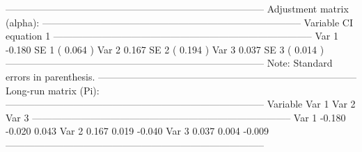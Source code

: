 \documentclass[article]{jss}
\begin{document}
\begin{CodeChunk}
\begin{CodeOutput}
--------------------------------------------------------------------------------
    Adjustment matrix (alpha):                                                                         
--------------------------------------------------------------------------------
      Variable        CI equation 1  
--------------------------------------------------------------------------------
        Var 1            -0.180     
         SE 1         (   0.064  )  
        Var 2             0.167     
         SE 2         (   0.194  )  
        Var 3             0.037     
         SE 3         (   0.014  )  
--------------------------------------------------------------------------------
Note: Standard errors in parenthesis.                                                                
--------------------------------------------------------------------------------
    Long-run matrix (Pi):                                                                       
--------------------------------------------------------------------------------
      Variable         Var 1          Var 2          Var 3   
--------------------------------------------------------------------------------
      Var 1           -0.180         -0.020          0.043    
      Var 2            0.167          0.019         -0.040    
      Var 3            0.037          0.004         -0.009    
--------------------------------------------------------------------------------


\end{CodeOutput}
\end{CodeChunk}
\end{document}
